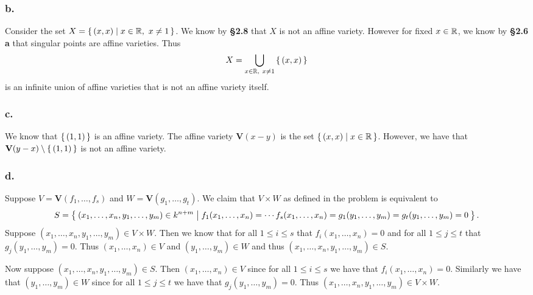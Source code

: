 \documentclass[letterpaper]{article}
\begin{document}
\subsubsection*{b.}

Consider the set $X = \set{(x, x) | x \in \mathbb{R},~ x \neq 1}$. We know by \textbf{\S 2.8} that $X$ is not an affine variety. However for fixed $x \in \mathbb{R}$, we know by \textbf{\S 2.6 a} that singular points are affine varieties. Thus
\[
  X = \bigcup_{x \in \mathbb{R},~ x \neq 1}\set{(x, x)}
\]
is an infinite union of affine varieties that is not an affine variety itself.

\subsubsection*{c.}

We know that $\set{(1, 1)}$ is an affine variety. The affine variety $\textbf{V}(x - y)$ is the set $\set{(x, x) | x \in \mathbb{R}}$. However, we have that $\textbf{V}(y - x) \setminus \set{(1, 1)}$ is not an affine variety.


\subsubsection*{d.}

Suppose $V = \textbf{V}(f_{1}, \ldots, f_{s})$ and $W = \textbf{V}(g_{1}, \ldots, g_{t})$. We claim that $V \times W$ as defined in the problem is equivalent to
\[
  S = \Set{(x_{1}, \ldots, x_{n}, y_{1}, \ldots, y_{m}) \in k^{n + m} | f_{1}(x_{1}, \ldots, x_{n}) = \cdots f_{s}(x_{1}, \ldots, x_{n}) = g_{1}(y_{1}, \ldots, y_{m}) = g_{t}(y_{1}, \ldots, y_{m}) = 0}.
\]
Suppose $(x_{1}, \ldots, x_{n}, y_{1}, \ldots, y_{m}) \in V \times W$. Then we know that for all $1 \leq i \leq s$ that $f_{i}(x_{1}, \ldots, x_{n}) = 0$ and for all $1 \leq j \leq t$ that $g_{j}(y_{1}, \ldots, y_{m}) = 0$. Thus $(x_{1}, \ldots, x_{n}) \in V$ and $(y_{1}, \ldots, y_{m}) \in W$ and thus $(x_{1}, \ldots, x_{n}, y_{1}, \ldots, y_{m}) \in S$.


Now suppose $(x_{1}, \ldots, x_{n}, y_{1}, \ldots, y_{m}) \in S$. Then $(x_{1}, \ldots, x_{n}) \in V$ since for all $1 \leq i \leq s$ we have that $f_{i}(x_{1}, \ldots, x_{n}) = 0$. Similarly we have that $(y_{1}, \ldots, y_{m}) \in W$ since for all $1 \leq j \leq t$ we have that $g_{j}(y_{1}, \ldots, y_{m}) = 0$. Thus  $(x_{1}, \ldots, x_{n}, y_{1}, \ldots, y_{m}) \in V \times W$.

\clearpage

\end{document}
